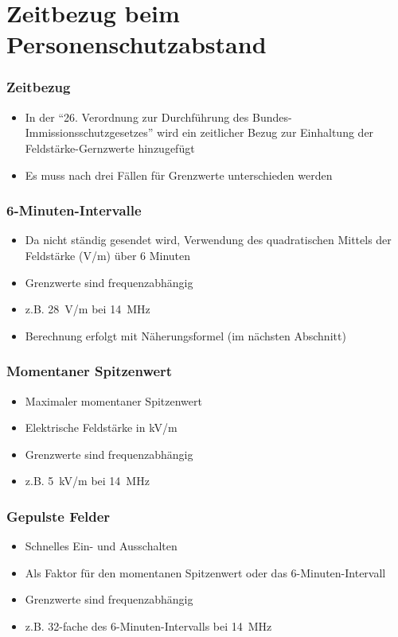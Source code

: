 
\section{Zeitbezug beim Personenschutzabstand}
\label{section:personenschutzabstand_zeitbezug}
\begin{frame}%

\frametitle{Zeitbezug}
\begin{itemize}
  \item In der \enquote{26. Verordnung zur Durchführung des Bundes-Immissionsschutzgesetzes} wird ein zeitlicher Bezug zur Einhaltung der Feldstärke-Gernzwerte hinzugefügt
  \item Es muss nach drei Fällen für Grenzwerte unterschieden werden
  \end{itemize}
\end{frame}

\begin{frame}
\frametitle{6-Minuten-Intervalle}
\begin{itemize}
  \item Da nicht ständig gesendet wird, Verwendung des quadratischen Mittels der Feldstärke (V/m) über 6 Minuten
  \item Grenzwerte sind frequenzabhängig
  \item z.B. \qty{28}{\volt}/m bei \qty{14}{\mega\hertz}
  \item Berechnung erfolgt mit Näherungsformel (im nächsten Abschnitt)
  \end{itemize}
\end{frame}

\begin{frame}
\frametitle{Momentaner Spitzenwert}
\begin{itemize}
  \item Maximaler momentaner Spitzenwert
  \item Elektrische Feldstärke in kV/m
  \item Grenzwerte sind frequenzabhängig
  \item z.B. \qty{5}{\kilo\volt}/m bei \qty{14}{\mega\hertz}
  \end{itemize}
\end{frame}

\begin{frame}
\frametitle{Gepulste Felder}
\begin{itemize}
  \item Schnelles Ein- und Ausschalten
  \item Als Faktor für den momentanen Spitzenwert oder das 6-Minuten-Intervall
  \item Grenzwerte sind frequenzabhängig
  \item z.B. 32-fache des 6-Minuten-Intervalls bei \qty{14}{\mega\hertz}
  \end{itemize}
\end{frame}

